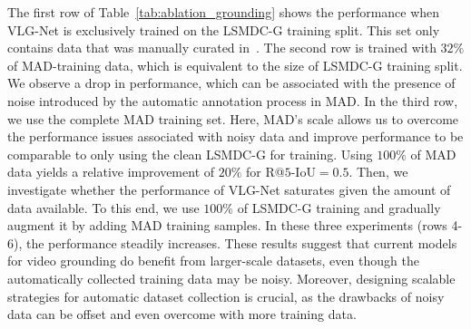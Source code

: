 \documentclass[10pt,twocolumn,letterpaper]{article}
\begin{document}
The first row of Table~\ref{tab:ablation_grounding} shows the performance when VLG-Net is exclusively trained on the LSMDC-G training split. This set only contains data that was manually curated in~\cite{rohrbach2017movie}. The second row is trained with $32\%$ of MAD-training data, which is equivalent to the size of LSMDC-G training split. We observe a drop in performance, which can be associated with the presence of noise introduced by the automatic annotation process in MAD. In the third row, we use the complete MAD training set. Here, MAD's scale allows us to overcome the performance issues associated with noisy data and improve performance to be comparable to only using the clean LSMDC-G for training. Using $100\%$ of MAD data yields a relative improvement of $20\%$ for R@$5$-IoU${=}0.5$. Then, we investigate whether the performance of VLG-Net saturates given the amount of data available. To this end, we use $100\%$ of LSMDC-G training and gradually augment it by adding MAD training samples. In these three experiments (rows 4-6), the performance steadily increases. These results suggest that current models for video grounding do benefit from larger-scale datasets, even though the automatically collected training data may be noisy. Moreover, designing scalable strategies for automatic dataset collection is crucial, as the drawbacks of noisy data can be offset and even overcome with more training data.

\begin{table}[!t]
    \centering
\setlength{\tabcolsep}{3pt}
\renewcommand{\arraystretch}{1} 
\vspace{-.1cm}
\caption{\label{tab:ablation_retrieval}{\bf Retrieval performance on LSMDC16 with model CLIP4Clip~\cite{luo2021clip4clip}.}  
This experiment showcases how MAD data can be valuable for a related task, beyond grounding.  
}
\vspace{-.2cm}
 \end{table}
\end{document}
